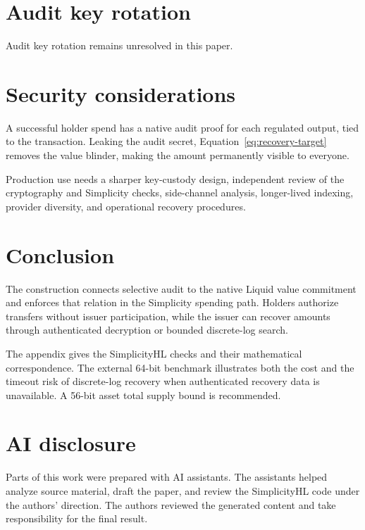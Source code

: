 \documentclass[11pt]{article}
\begin{document}
    \section{Audit key rotation}

    Audit key rotation remains unresolved in this paper.

    \section{Security considerations}
    \label{sec:security}

    A successful holder spend has a native audit proof for each regulated output, tied to the transaction.
    Leaking the audit secret, Equation~\ref{eq:recovery-target} removes the value blinder, making the amount permanently visible to everyone.

    Production use needs a sharper key-custody design, independent review of the cryptography and Simplicity checks, side-channel analysis, longer-lived indexing, provider diversity, and operational recovery procedures.

    \section{Conclusion}

    The construction connects selective audit to the native Liquid value commitment and enforces that relation in the Simplicity spending path.
    Holders authorize transfers without issuer participation, while the issuer can recover amounts through authenticated decryption or bounded discrete-log search.

    The appendix gives the SimplicityHL checks and their mathematical correspondence.
    The external 64-bit benchmark illustrates both the cost and the timeout risk of discrete-log recovery when authenticated recovery data is unavailable.
    A 56-bit asset total supply bound is recommended.


    \section*{AI disclosure}

    Parts of this work were prepared with AI assistants.
    The assistants helped analyze source material, draft the paper, and review the SimplicityHL code under the authors' direction.
    The authors reviewed the generated content and take responsibility for the final result.

        {\small\sloppy
    
    
    }

    \appendix
    
\end{document}
